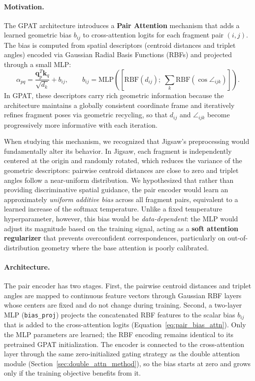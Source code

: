 \paragraph{Motivation.}
The GPAT architecture \cite{Li2023GPAT} introduces a \textbf{Pair Attention} mechanism that adds a learned geometric bias $b_{ij}$ to cross-attention logits for each fragment pair $(i, j)$. The bias is computed from spatial descriptors (centroid distances and triplet angles) encoded via Gaussian Radial Basis Functions (RBFs) and projected through a small MLP:
\begin{equation}
\label{eq:pair_bias_attn}
\alpha_{pq} = \frac{\mathbf{q}_p^T \mathbf{k}_q}{\sqrt{d_k}} + b_{ij}, \qquad
b_{ij} = \text{MLP}\!\left([\text{RBF}(d_{ij});\; \textstyle\sum_k \text{RBF}(\cos \angle_{ijk})]\right).
\end{equation}
In GPAT, these descriptors carry rich geometric information because the architecture maintains a globally consistent coordinate frame and iteratively refines fragment poses via geometric recycling, so that $d_{ij}$ and $\angle_{ijk}$ become progressively more informative with each iteration.

When studying this mechanism, we recognized that Jigsaw's preprocessing would fundamentally alter its behavior. In Jigsaw, each fragment is independently centered at the origin and randomly rotated, which reduces the variance of the geometric descriptors: pairwise centroid distances are close to zero and triplet angles follow a near-uniform distribution. We hypothesized that rather than providing discriminative spatial guidance, the pair encoder would learn an approximately \textit{uniform additive bias} across all fragment pairs, equivalent to a learned increase of the softmax temperature. Unlike a fixed temperature hyperparameter, however, this bias would be \textit{data-dependent}: the MLP would adjust its magnitude based on the training signal, acting as a \textbf{soft attention regularizer} that prevents overconfident correspondences, particularly on out-of-distribution geometry where the base attention is poorly calibrated.

\paragraph{Architecture.}
The pair encoder has two stages. First, the pairwise centroid distances and triplet angles are mapped to continuous feature vectors through Gaussian RBF layers whose centers are fixed and do not change during training. Second, a two-layer MLP (\texttt{bias\_proj}) projects the concatenated RBF features to the scalar bias $b_{ij}$ that is added to the cross-attention logits (Equation~\ref{eq:pair_bias_attn}). Only the MLP parameters are learned; the RBF encoding remains identical to its pretrained GPAT initialization. The encoder is connected to the cross-attention layer through the same zero-initialized gating strategy as the double attention module (Section~\ref{sec:double_attn_method}), so the bias starts at zero and grows only if the training objective benefits from it.

